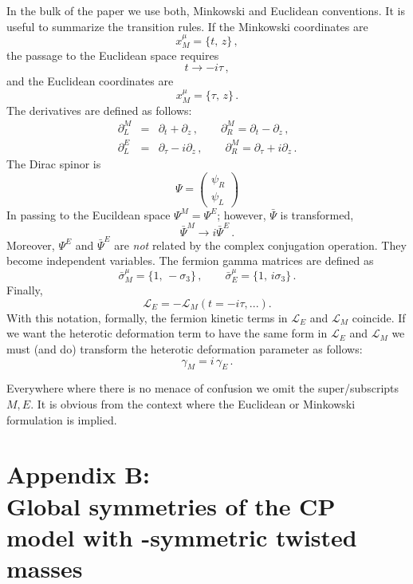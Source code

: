 \documentclass[epsfig,12pt]{article}
\def\beq{\begin{equation}}
\def\eeq{\end{equation}}
\def\beqn{\begin{eqnarray}}
\def\eeqn{\end{eqnarray}}
\newcommand{\cell}{{\mathcal L}}
\newcommand{\pt}{\partial}
\renewcommand{\theequation}{\thesection.\arabic{equation}}
\def\beqn{\begin{eqnarray}}
\def\eeqn{\end{eqnarray}}
\def\beq{\begin{equation}}
\def\eeq{\end{equation}}
\renewcommand{\theequation}{\thesection.\arabic{equation}}
\begin{document}
{ \renewcommand{\thesubsection}{A.\arabic{subsection}}
\setcounter{subsection}{0}

In the bulk of the paper we use both, Minkowski and Euclidean conventions.
It is useful to summarize the transition rules.
If the Minkowski coordinates are
\beq
x^\mu_M =\{t,\,z\}\,,
\eeq
the passage to the Euclidean space requires
\beq
t \to - i\tau\,,
\eeq
and the Euclidean coordinates are
\beq
x^\mu_M =\{\tau,\,z\}\,.
\eeq
The derivatives are defined as follows:
\beqn
\pt_L^M &=& \pt_t+\pt_z\,,\qquad \pt_R^M = \pt_t- \pt_z\,,
\nonumber\\[2mm]
\pt_L^E &=& \pt_\tau - i \pt_z\,,\qquad \pt_R^M = \pt_\tau + i \pt_z\,.
\eeqn
The Dirac spinor is
\beq
\Psi =\left(
\begin{array}{c}
\psi_R\\[1mm]
\psi_L
\end{array}
\right)
\eeq
In passing to the Eucildean space $\Psi^M = \Psi^E$;
however, $\bar\Psi$ is transformed,
\beq
\bar\Psi^M \to i \bar \Psi^E\,.
\eeq
Moreover, $\Psi^E$ and $\bar \Psi^E$ are {\em not} related by the complex conjugation operation.
They become independent variables. The fermion gamma matrices are defined as
\beq
\bar\sigma^\mu_M =\{1,\,-\sigma_3\}\,,\qquad \bar\sigma^\mu_E =\{1,\, i\sigma_3\}\,.
\eeq
Finally, 
\beq
\cell_E =- \cell_M (t=-i\tau , ...).
\eeq
With this notation, formally, the fermion kinetic terms in $\cell_E $ and $\cell_M $
coincide.
If we want the heterotic deformation term to have the same form in
$\cell_E $ and $\cell_M $ we must (and do) transform the heterotic deformation parameter as follows:
\beq
\gamma_M = i\,\gamma_E\,.
\eeq

Everywhere where there is no menace of confusion we omit the super/sub\-scripts $M,E$.
It is obvious from the context where the Euclidean or Minkowski formulation is implied.


\newpage

\section*{Appendix B: \\
Global symmetries of the CP model with -symmetric
 twisted masses}
 \renewcommand{\theequation}{B.\arabic{equation}}
\setcounter{equation}{0}
 
 \renewcommand{\thesubsection}{B.\arabic{subsection}}
\setcounter{subsection}{0}

}
\end{document}

